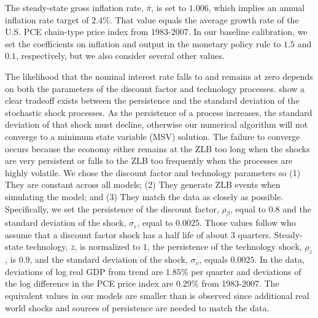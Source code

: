 \documentclass[12pt,final]{article}
\begin{document}
The steady-state gross inflation rate, $\bar{\pi}$, is set to $1.006$, which implies an annual inflation rate target of $2.4\%$. That value equals the average growth rate of the U.S. PCE chain-type price index from 1983-2007. In our baseline calibration, we set the coefficients on inflation and output in the monetary policy rule to $1.5$ and $0.1$, respectively, but we also consider several other values.

The likelihood that the nominal interest rate falls to and remains at zero depends on both the parameters of the discount factor and technology processes. \citet{RichterThrockmorton2015} show a clear tradeoff exists between the persistence and the standard deviation of the stochastic shock processes. As the persistence of a process increases, the standard deviation of that shock must decline, otherwise our numerical algorithm will not converge to a minimum state variable (MSV) solution. The failure to converge occurs because the economy either remains at the ZLB too long when the shocks are very persistent or falls to the ZLB too frequently when the processes are highly volatile. We chose the discount factor and technology parameters so (1) They are constant across all models; (2) They generate ZLB events when simulating the model; and (3) They match the data as closely as possible. Specifically, we set the persistence of the discount factor, $\rho_\beta$, equal to $0.8$ and the standard deviation of the shock, $\sigma_\varepsilon$, equal to $0.0025$. Those values follow \citet{FernandezVillaverdeEtAl2012} who assume that a discount factor shock has a half life of about $3$ quarters. Steady-state technology, $\bar{z}$, is normalized to $1$, the persistence of the technology shock, $\rho_z$, is $0.9$, and the standard deviation of the shock, $\sigma_\upsilon$, equals $0.0025$. In the data, deviations of log real GDP from trend are $1.85\%$ per quarter and deviations of the log difference in the PCE price index are $0.29\%$ from 1983-2007. The equivalent values in our models are smaller than is observed since additional real world shocks and sources of persistence are needed to match the data.



\end{document}
